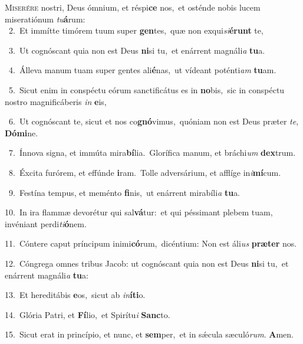 \lettrine{\initial\textcolor{\initialcolor}{M}}{iserére} nostri, Deus ómnium, et réspi\textbf{ce} nos,~\star et osténde nobis lucem miseratiónum \textit{tu}\-\textbf{á}rum:\\
{\numbfont\textcolor{\numbcolor}{~2.}}~Et immítte timórem tuum super \textbf{gen}\-tes,~\star quæ non exqui\-\textit{si}\-\textbf{é}\textbf{runt} te,\par
{\numbfont\textcolor{\numbcolor}{~3.}}~Ut cognóscant quia non est Deus \textbf{ni}\-si tu,~\star et enárrent magnáli\textit{a} \textbf{tu}\-a.\par
{\numbfont\textcolor{\numbcolor}{~4.}}~Álleva manum tuam super gentes ali\-\textbf{é}\-nas,~\star ut vídeant poténti\textit{am} \textbf{tu}\-am.\par
{\numbfont\textcolor{\numbcolor}{~5.}}~Sicut enim in conspéctu eórum sanctificátus es in \textbf{no}\-bis,~\star sic in conspéctu nostro magnificáberis \textit{in} \textbf{e}\-is,\par
{\numbfont\textcolor{\numbcolor}{~6.}}~Ut cognóscant te, sicut et nos co\-\textbf{gnó}\-vimus,~\star quóniam non est Deus præter \textit{te}\-, \textbf{Dó}\-\textbf{mi}ne.\par
{\numbfont\textcolor{\numbcolor}{~7.}}~Ínnova signa, et immúta mira\-\textbf{bí}\-lia.~\star Glorífica manum, et bráchi\textit{um} \textbf{dex}\-trum.\par
{\numbfont\textcolor{\numbcolor}{~8.}}~Éxcita furórem, et effúnde \textbf{i}\-ram.~\star Tolle adversárium, et afflíge in\-\textit{i}\-\textbf{mí}cum.\par
{\numbfont\textcolor{\numbcolor}{~9.}}~Festína tempus, et meménto \textbf{fi}\-nis,~\star ut enárrent mirabíli\textit{a} \textbf{tu}\-a.\par
{\numbfont\textcolor{\numbcolor}{10.}}~In ira flammæ devorétur qui sal\-\textbf{vá}\-tur:~\star et qui péssimant plebem tuam, invéniant perdi\-\textit{ti}\-\textbf{ó}nem.\par
{\numbfont\textcolor{\numbcolor}{11.}}~Cóntere caput príncipum inimi\-\textbf{có}\-rum,~\star dicéntium: Non est áli\textit{us} \textbf{præ}\-\textbf{ter} nos.\par
{\numbfont\textcolor{\numbcolor}{12.}}~Cóngrega omnes tribus Jacob: ut cognóscant quia non est Deus \textbf{ni}\-si tu,~\star et enárrent magnáli\textit{a} \textbf{tu}\-a:\par
{\numbfont\textcolor{\numbcolor}{13.}}~Et hereditábis \textbf{e}\-os,~\star sicut ab \textit{in}\-\textbf{í}\textbf{ti}o.\par
{\numbfont\textcolor{\numbcolor}{14.}}~Glória Patri, et \textbf{Fí}\-lio,~\star et Spirítu\textit{i} \textbf{Sanc}\-to.\par
{\numbfont\textcolor{\numbcolor}{15.}}~Sicut erat in princípio, et nunc, et \textbf{sem}\-per,~\star et in sǽcula sæculó\-\textit{rum}\-. \textbf{A}\-men.\par
